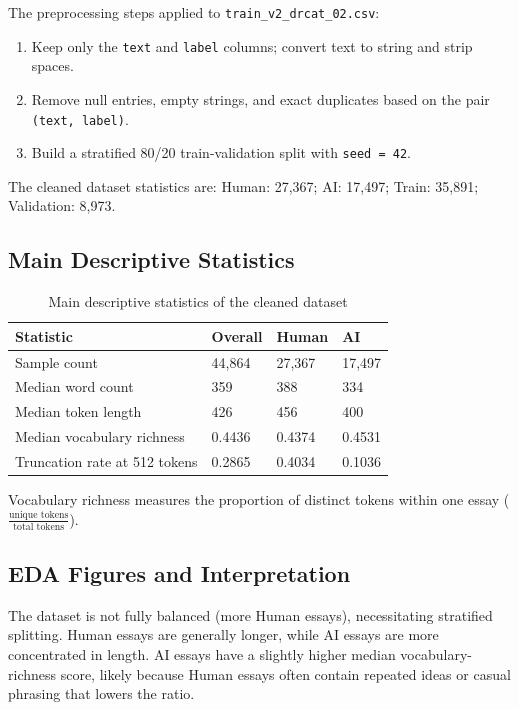 \documentclass[10pt,journal,onecolumn,draftclsnofoot]{IEEEtran}
\begin{document}
The preprocessing steps applied to \texttt{train\_v2\_drcat\_02.csv}:
\begin{enumerate}
\item Keep only the \texttt{text} and \texttt{label} columns; convert text to string and strip spaces.
\item Remove null entries, empty strings, and exact duplicates based on the pair \texttt{(text, label)}.
\item Build a stratified 80/20 train-validation split with \texttt{seed = 42}.
\end{enumerate}

The cleaned dataset statistics are: Human: 27,367; AI: 17,497; Train: 35,891; Validation: 8,973.

\subsection{Main Descriptive Statistics}

\begin{table}[H]
\centering
\caption{Main descriptive statistics of the cleaned dataset}
\label{tab:eda_stats}
\small
\setlength{\tabcolsep}{5pt}
\begin{tabular}{@{}L{5.2cm}R{2.2cm}R{2.2cm}R{2.2cm}@{}}
\toprule
Statistic & Overall & Human & AI \\
\midrule
Sample count & 44,864 & 27,367 & 17,497 \\
Median word count & 359 & 388 & 334 \\
Median token length & 426 & 456 & 400 \\
Median vocabulary richness & 0.4436 & 0.4374 & 0.4531 \\
Truncation rate at 512 tokens & 0.2865 & 0.4034 & 0.1036 \\
\bottomrule
\end{tabular}
\end{table}

Vocabulary richness measures the proportion of distinct tokens within one essay (\(\frac{\text{unique tokens}}{\text{total tokens}}\)).

\subsection{EDA Figures and Interpretation}

The dataset is not fully balanced (more Human essays), necessitating stratified splitting. Human essays are generally longer, while AI essays are more concentrated in length. AI essays have a slightly higher median vocabulary-richness score, likely because Human essays often contain repeated ideas or casual phrasing that lowers the ratio.
\end{document}
